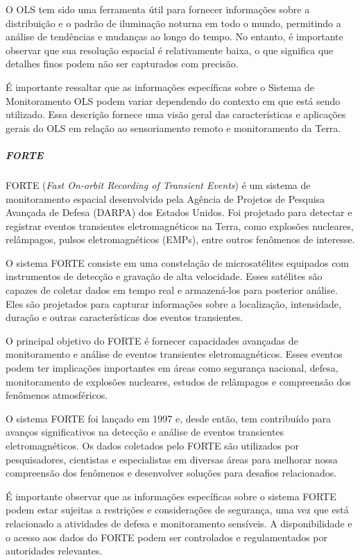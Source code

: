 \documentclass[a4paper, 12pt, onecolumn,singlespacing]{article}
\begin{document}
	O OLS tem sido uma ferramenta útil para fornecer informações sobre a distribuição e o padrão de iluminação noturna em todo o mundo, permitindo a análise de tendências e mudanças ao longo do tempo. No entanto, é importante observar que sua resolução espacial é relativamente baixa, o que significa que detalhes finos podem não ser capturados com precisão.
	
	É importante ressaltar que as informações específicas sobre o Sistema de Monitoramento OLS podem variar dependendo do contexto em que está sendo utilizado. Essa descrição fornece uma visão geral das características e aplicações gerais do OLS em relação ao sensoriamento remoto e monitoramento da Terra.
	
	\subparagraph{FORTE}
	
	FORTE (\textit{Fast On-orbit Recording of Transient Events}) é um sistema de monitoramento espacial desenvolvido pela Agência de Projetos de Pesquisa Avançada de Defesa (DARPA) dos Estados Unidos. Foi projetado para detectar e registrar eventos transientes eletromagnéticos na Terra, como explosões nucleares, relâmpagos, pulsos eletromagnéticos (EMPs), entre outros fenômenos de interesse.
	
	O sistema FORTE consiste em uma constelação de microsatélites equipados com instrumentos de detecção e gravação de alta velocidade. Esses satélites são capazes de coletar dados em tempo real e armazená-los para posterior análise. Eles são projetados para capturar informações sobre a localização, intensidade, duração e outras características dos eventos transientes.
	
	O principal objetivo do FORTE é fornecer capacidades avançadas de monitoramento e análise de eventos transientes eletromagnéticos. Esses eventos podem ter implicações importantes em áreas como segurança nacional, defesa, monitoramento de explosões nucleares, estudos de relâmpagos e compreensão dos fenômenos atmosféricos.
	
	O sistema FORTE foi lançado em 1997 e, desde então, tem contribuído para avanços significativos na detecção e análise de eventos transientes eletromagnéticos. Os dados coletados pelo FORTE são utilizados por pesquisadores, cientistas e especialistas em diversas áreas para melhorar nossa compreensão dos fenômenos e desenvolver soluções para desafios relacionados.
	
	É importante observar que as informações específicas sobre o sistema FORTE podem estar sujeitas a restrições e considerações de segurança, uma vez que está relacionado a atividades de defesa e monitoramento sensíveis. A disponibilidade e o acesso aos dados do FORTE podem ser controlados e regulamentados por autoridades relevantes.
	
\end{document}
